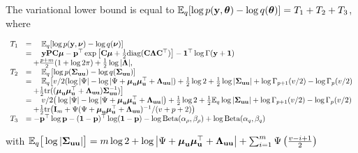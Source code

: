\documentclass{article}[12pt]
\begin{document}
The variational lower bound is equal to ${\mathbb E}_q[\log{p({\bf y}, {\boldsymbol\theta})} - \log{q({\boldsymbol\theta})}] = T_1 + T_2 + T_3$,
where

$$
\begin{array}{rl}
T_1 &= \quad {\mathbb E}_q[\log{p({\bf y}, {\boldsymbol\nu})} - \log{q({\boldsymbol\nu})}] \\
&= \quad {\bf y} {\bf P} {\bf C} {\boldsymbol\mu} - {\bf p}^\top \exp{\left[ {\bf C}{\boldsymbol\mu}+ {\frac{1}{2}}\text{diag} ({\bf C}{\boldsymbol\Lambda}{\bf C}^\top) \right]} - {\bf 1}^\top\log \Gamma{({\bf y}+ {\bf1})}\\
& \quad + \frac{p + m}{2} (1 + \log{2 \pi}) + {\frac{1}{2}} \log{|{\boldsymbol\Lambda}|}, \\
T_2 &= \quad {\mathbb E}_q \left[ \log p({\boldsymbol \Sigma}_{{\bf u} {\bf u}}) - \log q({\boldsymbol \Sigma}_{{\bf u} {\bf u}}) \right] \\
&= \quad {\mathbb E}_q \big[ v/2(\log |\Psi| - \log |\Psi + {\boldsymbol \mu}_{\bf u} {\boldsymbol \mu}_{\bf u}^\top + {\boldsymbol \Lambda}_{{\bf u} {\bf u}}|) + {\frac{1}{2}} \log 2 + {\frac{1}{2}} \log|{\boldsymbol \Sigma}_{{\bf u} {\bf u}}| + \log \Gamma_{p+1}(v/2) - \log \Gamma_{p}(v/2)\\
&\quad + {\frac{1}{2}} \text{tr}(({\boldsymbol \mu}_{{\bf u}} {\boldsymbol \mu}_{{\bf u}}^\top + {\boldsymbol \Lambda}_{{\bf u} {\bf u}}) {\boldsymbol \Sigma}_{{\bf u} {\bf u}}^{-1}) \big] \\
&= \quad v/2\big(\log |\Psi| - \log |\Psi + {\boldsymbol \mu}_{\bf u} {\boldsymbol \mu}_{\bf u}^\top + {\boldsymbol \Lambda}_{{\bf u} {\bf u}}|\big) + {\frac{1}{2}} \log 2 + {\frac{1}{2}} {\mathbb E}_q \log |{\boldsymbol \Sigma}_{{\bf u} {\bf u}}| + \log \Gamma_{p+1}(v/2) - \log \Gamma_{p}(v/2) \\
&\quad + {\frac{1}{2}} \text{tr}\big({\bf I}_m + \Psi(\Psi+ {\boldsymbol \mu}_{\bf u} {\boldsymbol \mu}_{\bf u}^\top + {\boldsymbol \Lambda}_{{\bf u} {\bf u}})^{-1}/(v + p + 2)\big) \\
T_3 &= - {\bf p}^\top \log {\bf p} - ({\bf 1} - {\bf p})^\top \log ({\bf 1} - {\bf p}) - \log \text{Beta} (\alpha_\rho, \beta_\rho) + \log \text{Beta} (\alpha_q, \beta_q)
\end{array}
$$

with ${\mathbb E}_q \big[ \log |{\boldsymbol \Sigma}_{{\bf u} {\bf u}}| \big] = m \log 2 + \log \left | \Psi + {\boldsymbol \mu}_{\bf u} {\boldsymbol \mu}_{\bf u}^\top + {\boldsymbol \Lambda}_{{\bf u} {\bf u}} \right | + \sum_{i=1}^m \Psi \left ( \frac{v - i + 1}{2} \right )$



\end{document}
